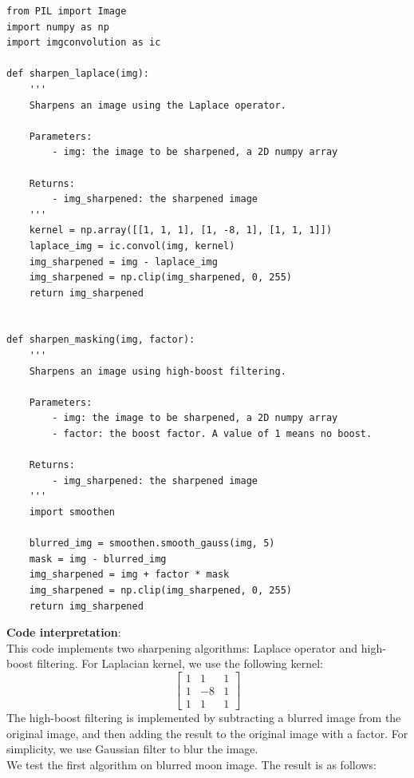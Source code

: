 \documentclass[UTF8]{ctexart}
\begin{document}
\begin{lstlisting}
from PIL import Image
import numpy as np
import imgconvolution as ic

def sharpen_laplace(img):
    '''
    Sharpens an image using the Laplace operator.
    
    Parameters:
        - img: the image to be sharpened, a 2D numpy array
        
    Returns:
        - img_sharpened: the sharpened image
    '''
    kernel = np.array([[1, 1, 1], [1, -8, 1], [1, 1, 1]])
    laplace_img = ic.convol(img, kernel)
    img_sharpened = img - laplace_img
    img_sharpened = np.clip(img_sharpened, 0, 255)
    return img_sharpened


def sharpen_masking(img, factor):
    '''
    Sharpens an image using high-boost filtering.

    Parameters:
        - img: the image to be sharpened, a 2D numpy array
        - factor: the boost factor. A value of 1 means no boost.

    Returns:
        - img_sharpened: the sharpened image
    '''
    import smoothen
    
    blurred_img = smoothen.smooth_gauss(img, 5)
    mask = img - blurred_img
    img_sharpened = img + factor * mask
    img_sharpened = np.clip(img_sharpened, 0, 255)
    return img_sharpened
\end{lstlisting}
\textbf{Code interpretation}:\\
This code implements two sharpening algorithms: Laplace operator and high-boost filtering. For Laplacian kernel, we use the following kernel:
\[
\begin{bmatrix}
    1 & 1 & 1\\
    1 & -8 & 1\\
    1 & 1 & 1
\end{bmatrix}
\]
The high-boost filtering is implemented by subtracting a blurred image from the original image, and then adding the result to the original image with a factor.
For simplicity, we use Gaussian filter to blur the image.\\
We test the first algorithm on blurred moon image. The result is as follows:\\
\end{document}
